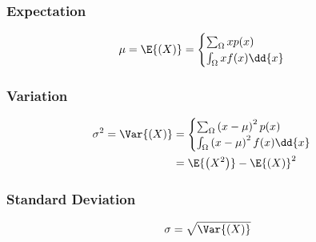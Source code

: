 \documentclass{article}
\begin{document}
\begin{multicols}{3}
    \subsubsection*{Expectation}
    \begin{equation*}
        \mu = \E{\left( X \right)} =
        \begin{cases}
            \sum_\Omega x p(x) \\
            \int_\Omega x f(x) \dd{x}
        \end{cases}
    \end{equation*}
    \subsubsection*{Variation}
    \begin{align*}
        \sigma^2 = \Var{\left( X \right)} & =
        \begin{cases}
            \sum_\Omega \left( x - \mu \right)^2 p(x) \\
            \int_\Omega \left( x - \mu \right)^2 f(x) \dd{x}
        \end{cases}                                       \\
                                          & = \E{\left( X^2 \right)} - \E{\left( X \right)}^2
    \end{align*}
    \subsubsection*{Standard Deviation}
    \begin{equation*}
        \sigma = \sqrt{\Var{\left( X \right)}}
    \end{equation*}

\end{multicols}
\end{document}
